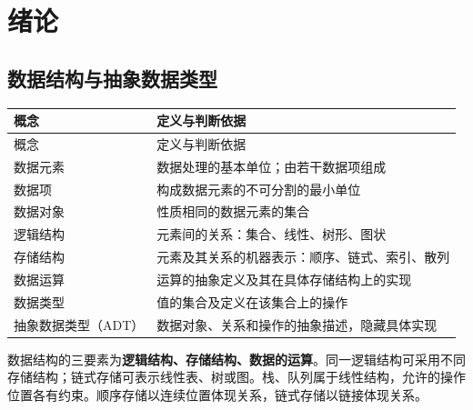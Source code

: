 \chapter{绪论}\label{DS01}

\section{数据结构与抽象数据类型}\label{DS01-structure}

\par\smallskip
{\fontsize{9.3}{12}\selectfont\setlength{\tabcolsep}{2.5pt}\setlength{\LTleft}{0pt}\setlength{\LTright}{0pt}
\begin{longtable}{@{}>{\raggedright\arraybackslash}p{}>{\raggedright\arraybackslash}p{}@{}}
\toprule
概念 & 定义与判断依据 \\

\midrule\endfirsthead\toprule
概念 & 定义与判断依据 \\

\midrule\endhead\bottomrule\endfoot
数据元素 & 数据处理的基本单位；由若干数据项组成 \\

数据项 & 构成数据元素的不可分割的最小单位 \\

数据对象 & 性质相同的数据元素的集合 \\

逻辑结构 & 元素间的关系：集合、线性、树形、图状 \\

存储结构 & 元素及其关系的机器表示：顺序、链式、索引、散列 \\

数据运算 & 运算的抽象定义及其在具体存储结构上的实现 \\

数据类型 & 值的集合及定义在该集合上的操作 \\

抽象数据类型（ADT） & 数据对象、关系和操作的抽象描述，隐藏具体实现 \\

\end{longtable}}
\par\smallskip

数据结构的三要素为\textbf{逻辑结构、存储结构、数据的运算}。同一逻辑结构可采用不同存储结构；链式存储可表示线性表、树或图。栈、队列属于线性结构，允许的操作位置各有约束。顺序存储以连续位置体现关系，链式存储以链接体现关系。

